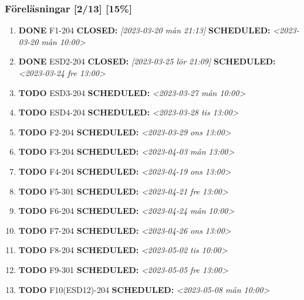 \documentclass[11pt]{article}
\begin{document}
\subsubsection{Föreläsningar [2/13] [15\%]}
\label{sec:orga21da79}
\begin{enumerate}
\item {\bfseries\sffamily DONE} F1-204
\label{sec:org3b58001}
\noindent\textbf{CLOSED:} \textit{[2023-03-20 mån 21:13] } \textbf{SCHEDULED:} \textit{<2023-03-20 mån 10:00>}\\[0pt]
\item {\bfseries\sffamily DONE} ESD2-204
\label{sec:org7b096ef}
\noindent\textbf{CLOSED:} \textit{[2023-03-25 lör 21:09] } \textbf{SCHEDULED:} \textit{<2023-03-24 fre 13:00>}\\[0pt]
\item {\bfseries\sffamily TODO} ESD3-204
\label{sec:org8ef4513}
\noindent\textbf{SCHEDULED:} \textit{<2023-03-27 mån 10:00>}\\[0pt]
\item {\bfseries\sffamily TODO} ESD4-204
\label{sec:orgc6165b9}
\noindent\textbf{SCHEDULED:} \textit{<2023-03-28 tis 13:00>}\\[0pt]
\item {\bfseries\sffamily TODO} F2-204
\label{sec:orgfc5bb75}
\noindent\textbf{SCHEDULED:} \textit{<2023-03-29 ons 13:00>}\\[0pt]
\item {\bfseries\sffamily TODO} F3-204
\label{sec:orgf465f06}
\noindent\textbf{SCHEDULED:} \textit{<2023-04-03 mån 13:00>}\\[0pt]
\item {\bfseries\sffamily TODO} F4-204
\label{sec:orgb315a32}
\noindent\textbf{SCHEDULED:} \textit{<2023-04-19 ons 13:00>}\\[0pt]
\item {\bfseries\sffamily TODO} F5-301
\label{sec:org64bb8e9}
\noindent\textbf{SCHEDULED:} \textit{<2023-04-21 fre 13:00>}\\[0pt]
\item {\bfseries\sffamily TODO} F6-204
\label{sec:org6c66019}
\noindent\textbf{SCHEDULED:} \textit{<2023-04-24 mån 10:00>}\\[0pt]
\item {\bfseries\sffamily TODO} F7-204
\label{sec:org00a3c01}
\noindent\textbf{SCHEDULED:} \textit{<2023-04-26 ons 13:00>}\\[0pt]
\item {\bfseries\sffamily TODO} F8-204
\label{sec:orge8a2cc9}
\noindent\textbf{SCHEDULED:} \textit{<2023-05-02 tis 10:00>}\\[0pt]
\item {\bfseries\sffamily TODO} F9-301
\label{sec:org0692fda}
\noindent\textbf{SCHEDULED:} \textit{<2023-05-05 fre 13:00>}\\[0pt]
\item {\bfseries\sffamily TODO} F10(ESD12)-204
\label{sec:org305747f}
\noindent\textbf{SCHEDULED:} \textit{<2023-05-08 mån 10:00>}\\[0pt]
\end{enumerate}
\end{document}
